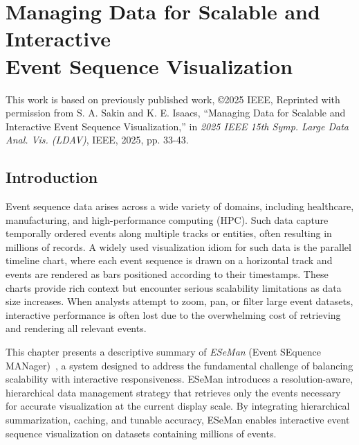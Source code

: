 \chapter[Managing Data for Scalable and Interactive Event Sequence Visualization]{Managing Data for Scalable and Interactive \\ Event Sequence Visualization}
\label{chap:eseman}

\begin{refsection}
This work is based on previously published work, \copyright  2025 IEEE, Reprinted with permission from S. A. Sakin and K. E. Isaacs, ``Managing Data for Scalable and Interactive Event Sequence Visualization,'' in \emph{2025 IEEE 15th Symp. Large Data Anal. Vis. (LDAV)}, IEEE, 2025, pp. 33-43.

\section{Introduction}
\label{sec:eseman_intro}

Event sequence data arises across a wide variety of domains, including healthcare, manufacturing, and high-performance computing (HPC). Such data capture temporally ordered events along multiple tracks or entities, often resulting in millions of records. A widely used visualization idiom for such data is the parallel timeline chart, where each event sequence is drawn on a horizontal track and events are rendered as bars positioned according to their timestamps. These charts provide rich context but encounter serious scalability limitations as data size increases. When analysts attempt to zoom, pan, or filter large event datasets, interactive performance is often lost due to the overwhelming cost of retrieving and rendering all relevant events.

\begin{sloppypar}
This chapter presents a descriptive summary of \textit{ESeMan} (Event SEquence MANager)~\cite{sakin2025managing}, a system designed to address the fundamental challenge of balancing scalability with interactive responsiveness. ESeMan introduces a resolution-aware, hierarchical data management strategy that retrieves only the events necessary for accurate visualization at the current display scale. By integrating hierarchical summarization, caching, and tunable accuracy, ESeMan enables interactive event sequence visualization on datasets containing millions of events. 
\end{sloppypar}


\end{refsection}
